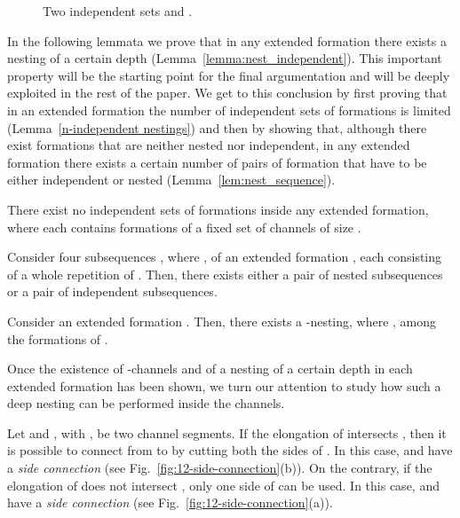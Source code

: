 \documentclass[a4paper,10pt]{llncs}
\newcounter{prop}
\begin{document}
\begin{figure}[htb]
\caption{Two independent sets  and .}
  \label{fig:independent}
\end{figure}

In the following lemmata we prove that in any extended formation there exists a nesting of a certain depth (Lemma~\ref{lemma:nest_independent}). This important property will be the starting point for the final argumentation and will be deeply exploited in the rest of the paper. We get to this conclusion by first proving that in an extended formation the number of independent sets of formations is limited (Lemma~\ref{n-independent nestings}) and then by showing that, although there exist formations that are neither nested nor independent, in any extended formation there exists a certain number of pairs of formation that have to be either independent or nested (Lemma~\ref{lem:nest_sequence}).

\begin{lemma}\label{n-independent nestings}
There exist no  independent sets of formations  inside any extended formation,
where each  contains formations of a fixed set of channels of size .
\end{lemma}

\begin{lemma}\label{lem:nest_sequence}
Consider four subsequences , where , of an extended formation , each consisting of a whole repetition of . Then, there exists either a pair of nested subsequences or a pair of independent subsequences.
\end{lemma}

\begin{lemma}\label{lemma:nest_independent}
Consider an extended formation .
Then, there exists a -nesting, where , among the formations of .
\end{lemma}

Once the existence of -channels and of a nesting of a certain depth in each extended formation has been shown, we turn our attention to study how such a deep nesting can be performed inside the channels.

Let  and , with , be two channel segments. If the elongation of  intersects , then it is possible to connect from  to  by cutting both the sides of . In this case,  and  have a \emph{side connection} (see Fig.~\ref{fig:12-side-connection}(b)). On the contrary, if the elongation of  does not intersect , only one side of  can be used. In this case,  and  have a \emph{side connection} (see Fig.~\ref{fig:12-side-connection}(a)).
\end{document}
